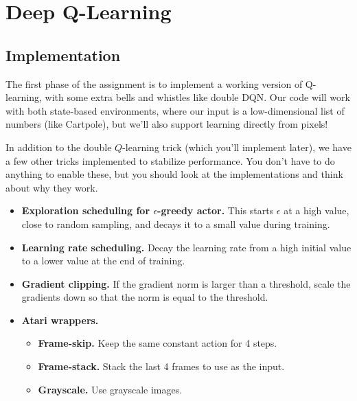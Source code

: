 \documentclass{article}
\begin{document}
\endgroup




\section{Deep Q-Learning}


\subsection{Implementation}

The first phase of the assignment is to implement a working version of Q-learning, with some extra bells and whistles like double DQN. Our code will work with both state-based environments, where our input is a low-dimensional list of numbers (like Cartpole), but we'll also support learning directly from pixels!

In addition to the double $Q$-learning trick (which you'll implement later), we have a few other tricks implemented to stabilize performance. You don't have to do anything to enable these, but you should look at the implementations and think about why they work.
\begin{itemize}
    \item \textbf{Exploration scheduling for $\epsilon$-greedy actor.} This starts $\epsilon$ at a high value, close to random sampling, and decays it to a small value during training.
    \item \textbf{Learning rate scheduling.} Decay the learning rate from a high initial value to a lower value at the end of training.
    \item \textbf{Gradient clipping.} If the gradient norm is larger than a threshold, scale the gradients down so that the norm is equal to the threshold.
    \item \textbf{Atari wrappers.}
    \begin{itemize}
        \item \textbf{Frame-skip.} Keep the same constant action for 4 steps.
        \item \textbf{Frame-stack.} Stack the last 4 frames to use as the input.
        \item \textbf{Grayscale.} Use grayscale images.
    \end{itemize}
\end{itemize}
\end{document}
